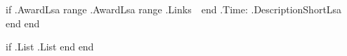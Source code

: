     {{ if .AwardLsa }}
            {{range .AwardLsa}}%
                {{range .Links}}%
                \href{{print "{" . "}" }}{\extlinkIcon}\,\,%
                {{end}}%
                {{.Time}}: %
                {{.DescriptionShortLsa}} \\[5pt]%
            {{end}}%
        \vspace{-17pt}
    {{ end }}

    {{ if .List }}%
        {{.List}}
    {{ end }}%
{{ end }}